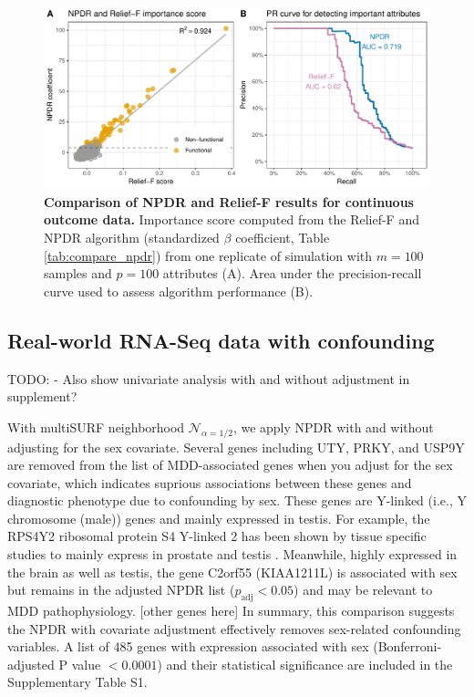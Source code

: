 \documentclass[10pt]{article}
\begin{document}
\begin{figure}[h]
\centerline{\includegraphics[]{../figs/npdr_relief_qtrait.pdf}}
\caption{{\bf Comparison of NPDR and Relief-F results for continuous outcome data.} Importance score computed from the Relief-F and NPDR algorithm (standardized $\beta$ coefficient, Table \ref{tab:compare_npdr}) from one replicate of simulation with $m = 100$ samples and $p = 100$ attributes (A). Area under the precision-recall curve used to assess algorithm performance (B).}
\label{fig:npdr_relief_qtrait}
\end{figure}

\subsection{Real-world RNA-Seq data with confounding}

TODO:
- Also show univariate analysis with and without adjustment in supplement? 


With multiSURF neighborhood $\mathcal{N}_{\alpha=1/2}$, we apply NPDR with and without adjusting for the sex covariate.
Several genes including UTY, PRKY, and USP9Y are removed from the list of MDD-associated genes when you adjust for the sex covariate, which indicates suprious associations between these genes and diagnostic phenotype due to confounding by sex.
These genes are Y-linked (i.e., Y chromosome (male)) genes and mainly expressed in testis.
For example, the RPS4Y2 ribosomal protein S4 Y-linked 2 has been shown by tissue specific studies to mainly express in prostate and testis \cite{lopes2010human}.
Meanwhile, highly expressed in the brain as well as testis, the gene C2orf55 (KIAA1211L) is associated with sex but remains in the adjusted NPDR list ($p_\textrm{adj} < 0.05$) and may be relevant to MDD pathophysiology.
[other genes here]
In summary, this comparison suggests the NPDR with covariate adjustment effectively removes sex-related confounding variables.
A list of 485 genes with expression associated with sex (Bonferroni-adjusted P value $<0.0001$) and their statistical significance are included in the Supplementary Table S1.
\end{document}
